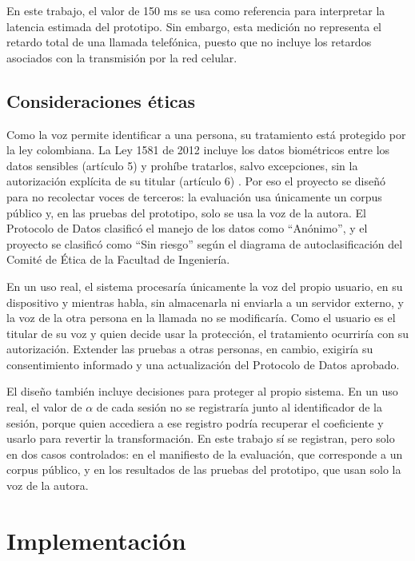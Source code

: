 \documentclass[10pt,twocolumn]{article}
\newcommand{\parencite}[1]{\citep{#1}}
\begin{document}
En este trabajo, el valor de 150 ms se usa como referencia para interpretar la latencia estimada del prototipo. Sin embargo, esta medición no representa el retardo total de una llamada telefónica, puesto que no incluye los retardos asociados con la transmisión por la red celular.

\subsection{Consideraciones éticas}\label{sec:3.8}

Como la voz permite identificar a una persona, su tratamiento está protegido por la ley colombiana. La Ley 1581 de 2012 incluye los datos biométricos entre los datos sensibles (artículo 5) y prohíbe tratarlos, salvo excepciones, sin la autorización explícita de su titular (artículo 6) \parencite{ley1581}. Por eso el proyecto se diseñó para no recolectar voces de terceros: la evaluación usa únicamente un corpus público y, en las pruebas del prototipo, solo se usa la voz de la autora. El Protocolo de Datos clasificó el manejo de los datos como ``Anónimo'', y el proyecto se clasificó como ``Sin riesgo'' según el diagrama de autoclasificación del Comité de Ética de la Facultad de Ingeniería.

En un uso real, el sistema procesaría únicamente la voz del propio usuario, en su dispositivo y mientras habla, sin almacenarla ni enviarla a un servidor externo, y la voz de la otra persona en la llamada no se modificaría. Como el usuario es el titular de su voz y quien decide usar la protección, el tratamiento ocurriría con su autorización. Extender las pruebas a otras personas, en cambio, exigiría su consentimiento informado y una actualización del Protocolo de Datos aprobado.

El diseño también incluye decisiones para proteger al propio sistema. En un uso real, el valor de $\alpha$ de cada sesión no se registraría junto al identificador de la sesión, porque quien accediera a ese registro podría recuperar el coeficiente y usarlo para revertir la transformación. En este trabajo sí se registran, pero solo en dos casos controlados: en el manifiesto de la evaluación, que corresponde a un corpus público, y en los resultados de las pruebas del prototipo, que usan solo la voz de la autora.

\section{Implementación}\label{sec:4}
\end{document}
